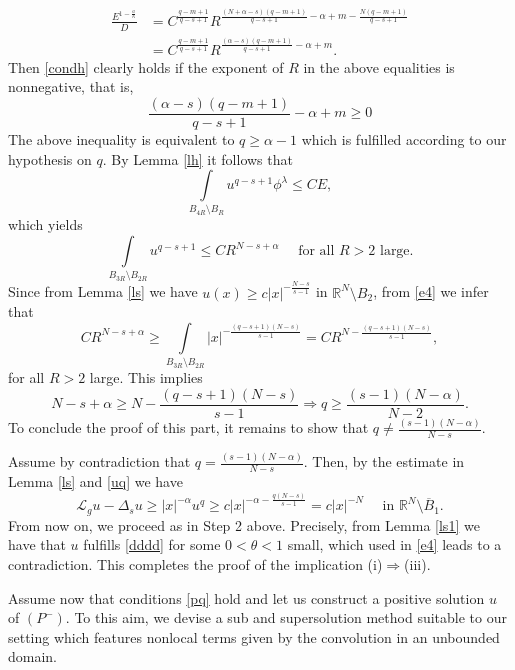 \documentclass[leqno,12pt]{article}
\numberwithin{equation}{section}
\newcommand{\R}{\mathbb R}
\newcommand{\Ro}{\mathbb R^N\setminus \overline B_1}
\newcommand{\Lg}{{\mathcal L}_g}
\begin{document}
$$
\begin{aligned}
\frac{E^{1-\frac{a}{\kappa}}}{D}&=C^{\frac{q-m+1}{q-s+1}} R^{\frac{(N+\alpha-s)(q-m+1)}{q-s+1}-\alpha+m-\frac{N(q-m+1)}{q-s+1}}\\
&=C^{\frac{q-m+1}{q-s+1}} R^{\frac{(\alpha-s)(q-m+1)}{q-s+1}-\alpha+m}.
\end{aligned}
$$
Then \eqref{condh} clearly holds if the exponent of $R$ in the above equalities is nonnegative, that is,
$$
\frac{(\alpha-s)(q-m+1)}{q-s+1}-\alpha+m\geq 0
$$
The above inequality is equivalent to $q\geq \alpha-1$ which is fulfilled according to our hypothesis on $q$. By Lemma \ref{lh} it follows that 
$$
\int\limits_{B_{4R}\setminus B_R} u^{q-s+1}\phi^\lambda \leq C E,
$$
which yields
\begin{equation}\label{e4}
\int\limits_{B_{3R}\setminus B_{2R}} u^{q-s+1} \leq CR^{N-s+\alpha} \quad\mbox{ for all $R>2$ large.}
\end{equation}
Since from Lemma \ref{ls} we have $u(x)\geq c|x|^{-\frac{N-s}{s-1}}$ in $\R^N\setminus B_{2}$, from \eqref{e4} we infer that
$$
CR^{N-s+\alpha}\geq \int\limits_{B_{3R}\setminus B_{2R}} |x|^{-\frac{(q-s+1)(N-s)}{s-1}}=CR^{N-\frac{(q-s+1)(N-s)}{s-1}}, 
$$
for all $R>2$ large. This implies
$$
N-s+\alpha\geq N-\frac{(q-s+1)(N-s)}{s-1}\Longrightarrow q\geq \frac{(s-1)(N-\alpha)}{N-2}.
$$
To conclude the proof of this part, it remains to show that $q\neq \frac{(s-1)(N-\alpha)}{N-s}$.


Assume by contradiction that $q=\frac{(s-1)(N-\alpha)}{N-s}$. Then, by the estimate in Lemma \ref{ls} and \eqref{uq} we have 
$$
\Lg u-\Delta_s u\geq |x|^{-\alpha}u^q\geq c|x|^{-\alpha-\frac{q(N-s)}{s-1}}=c|x|^{-N}\quad\mbox{ in }\Ro.
$$
From now on, we proceed as in Step 2 above. Precisely, from Lemma \ref{ls1} we have that $u$ fulfills \eqref{dddd} for some $0<\theta<1$ small, which used in \eqref{e4} leads to a contradiction. This completes the proof of the implication (i)$\Longrightarrow$(iii).

\smallskip

 Assume now that conditions \eqref{pq} hold and let us construct a positive solution $u$ of $(P^-)$.
To this aim, we devise a sub and supersolution method suitable to our setting which features nonlocal terms given by the convolution in an unbounded domain.
\end{document}
